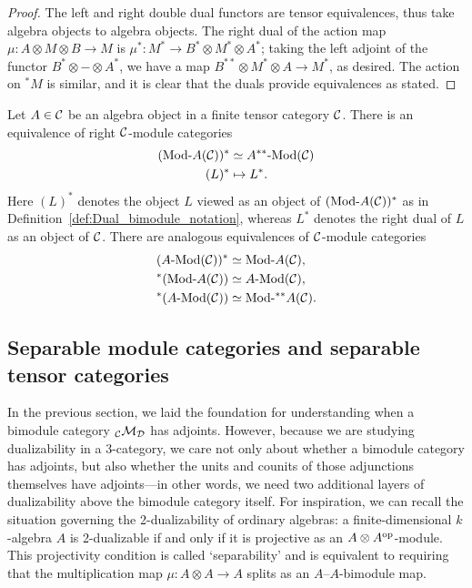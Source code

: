 \documentclass{amsart}
\begin{document}
\begin{proof}
The left and right double dual functors are tensor equivalences, thus take algebra objects to algebra objects.  The right dual of the action map $\mu: A \otimes M \otimes B \rightarrow M$ is $\mu^*: M^* \rightarrow B^* \otimes M^* \otimes A^*$; taking the left adjoint of the functor $B^* \otimes - \otimes A^*$, we have a map $B^{**} \otimes M^* \otimes A \rightarrow M^*$, as desired.  The action on ${}^* M$ is similar, and it is clear that the duals provide equivalences as stated.
\end{proof}

\begin{corollary} \label{cor:dualamod}
Let $A \in \mathcal C$ be an algebra object in a finite tensor category $\mathcal C$.  There is an equivalence of right $\mathcal C$-module categories
	\begin{align*}
		(\Mod{}{A}(\cC))^* & \simeq \Mod{A^{**}}{}(\cC) \\
		(L)^* & \mapsto L^*.
	\end{align*}
Here $(L)^*$ denotes the object $L$ viewed as an object of $(\Mod{}{A}(\cC))^*$ as in Definition~\ref{def:Dual_bimodule_notation}, whereas $L^*$ denotes the right dual of $L$ as an object of $\mathcal C$.  There are analogous equivalences of $\mathcal C$-module categories
\begin{align*}
(\Mod{A}{}(\cC))^* &\simeq \Mod{}{A}(\cC), \\
{}^*(\Mod{}{A}(\cC)) &\simeq \Mod{A}{}(\cC), \\
{}^*(\Mod{A}{}(\cC)) &\simeq \Mod{}{{}^{**}A}(\cC).
\end{align*}
\end{corollary}

\subsection{Separable module categories and separable tensor categories} \label{sec:tc-separable}

In the previous section, we laid the foundation for understanding when a bimodule category ${}_\mathcal C \mathcal M_\mathcal D$ has adjoints.  However, because we are studying dualizability in a 3-category, we care not only about whether a bimodule category has adjoints, but also whether the units and counits of those adjunctions themselves have adjoints---in other words, we need two additional layers of dualizability above the bimodule category itself.  For inspiration, we can recall the situation governing the 2-dualizability of ordinary algebras: a finite-dimensional $k$-algebra $A$ is 2-dualizable if and only if it is projective as an $A \otimes A^{\mathrm{op}}$-module.  This projectivity condition is called `separability' and is equivalent to requiring that the multiplication map $\mu: A \otimes A \rightarrow A$ splits as an $A$--$A$-bimodule map.  
\end{document}
